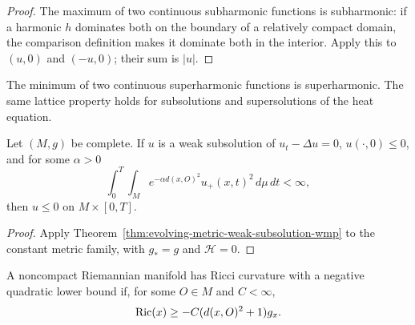 \begin{proof}
\sketch
{}
The maximum of two continuous subharmonic functions is subharmonic: if a
harmonic $h$ dominates both on the boundary of a relatively compact domain,
the comparison definition makes it dominate both in the interior.  Apply this
to $(u,0)$ and $(-u,0)$; their sum is $|u|$.
\end{proof}

\begin{remark}
\label{rem:minimum-superharmonic-functions}


The minimum of two continuous superharmonic functions is superharmonic.  The
same lattice property holds for subsolutions and supersolutions of the heat
equation.
\end{remark}

\begin{theorem}
\label{thm:static-weak-subsolution-wmp}

Let $(M,g)$ be complete.  If $u$ is a weak subsolution of $u_t-\Delta u=0$,
$u(\cdot,0)\leq0$, and for some $\alpha>0$
\[
\int_0^T\!\int_M e^{-\alpha d(x,O)^2}u_+(x,t)^2\,d\mu\,dt<\infty,
\]
then $u\leq0$ on $M\times[0,T]$.
\end{theorem}

\begin{proof}
\sketch
{}
Apply Theorem~\ref{thm:evolving-metric-weak-subsolution-wmp} to the constant
metric family, with $g_*=g$ and $\mathcal H=0$.
\end{proof}

\begin{definition}
\label{def:negative-quadratic-ricci-lower-bound}

A noncompact Riemannian manifold has Ricci curvature with a negative
quadratic lower bound if, for some $O\in M$ and $C<\infty$,
\[
\operatorname{Ric}(x)\geq-C(d(x,O)^2+1)g_x.
\]
\end{definition}

